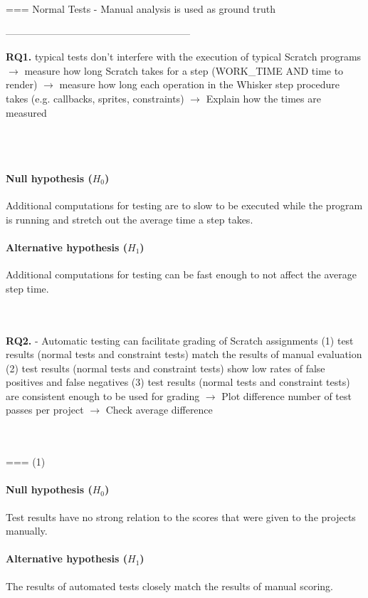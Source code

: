 === Normal Tests
- Manual analysis is used as ground truth

--------------------------------------------------------

\textbf{RQ1.} typical tests don't interfere with the execution of typical Scratch programs
$\rightarrow$ measure how long Scratch takes for a step (WORK\_TIME AND time to render)
$\rightarrow$ measure how long each operation in the Whisker step procedure takes (e.g. callbacks, sprites, constraints)
$\rightarrow$ Explain how the times are measured

~\\~\\
\paragraph{Null hypothesis ($H_0$)}
Additional computations for testing are to slow to be executed while the program is running and stretch out the average time a step takes.
\paragraph{Alternative hypothesis ($H_1$)}
Additional computations for testing can be fast enough to not affect the average step time.

~\\~\\
\textbf{RQ2.}
- Automatic testing can facilitate grading of Scratch assignments
    (1) test results (normal tests and constraint tests) match the results of manual evaluation
    (2) test results (normal tests and constraint tests) show low rates of false positives and false negatives
    (3) test results (normal tests and constraint tests) are consistent enough to be used for grading
        $\rightarrow$ Plot difference number of test passes per project
        $\rightarrow$ Check average difference

~\\~\\
=== (1)
\paragraph{Null hypothesis ($H_0$)}
Test results have no strong relation to the scores that were given to the projects manually.
\paragraph{Alternative hypothesis ($H_1$)}
The results of automated tests closely match the results of manual scoring.

